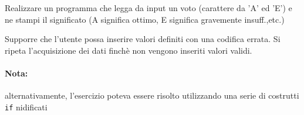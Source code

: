 \begin{Exercise}[label={ex:switch_easy}]

    \Question Realizzare un programma che legga da input un voto (carattere da 'A' ed 'E') e ne stampi il significato (A significa ottimo, E significa gravemente insuff.,etc.)
    
    \Question Supporre che l'utente possa inserire valori definiti con una codifica errata. Si ripeta l'acquisizione dei dati finchè non vengono inseriti valori validi.

\end{Exercise}

\begin{Answer}[ref={ex:switch_easy}]
		\Question 

        \Question 

        \paragraph{Nota:} alternativamente, l'esercizio poteva essere risolto utilizzando una serie di costrutti \texttt{if} nidificati

        
\end{Answer}